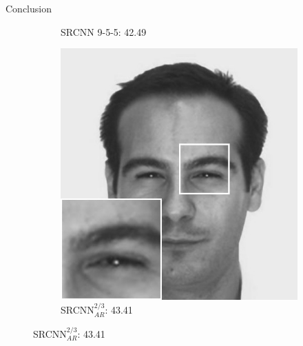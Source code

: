 \begin{frame}{Conclusion}{}
{\begin{figure}
\begin{subfigure}[b]{0.235\textwidth}
                \caption*{\scriptsize SRCNN 9-5-5: 42.49}
            \end{subfigure}
            \begin{subfigure}[b]{0.235\textwidth}
                \includegraphics[width=\textwidth]{sections/malte_slides/arFine-finetune.jpg}
                \caption*{\scriptsize SRCNN$_{AR}^{2/3}$: 43.41}
            \end{subfigure}
        \end{figure}
    }
\end{frame}

